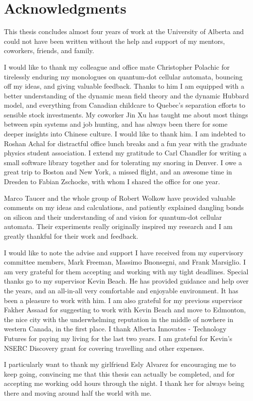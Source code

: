 \chapter*{Acknowledgments}

This thesis concludes almost four years of work at the University of
Alberta and could not have been written without the help and support of my
mentors, coworkers, friends, and family.

I would like to thank my colleague and office mate Christopher Polachic for
tirelessly enduring my monologues on quantum-dot cellular automata, bouncing off
my ideas, and giving valuable feedback. Thanks to him I am equipped with a
better understanding of the dynamic mean field theory and the dynamic Hubbard
model, and everything from Canadian childcare to Quebec's separation efforts to
sensible stock investments.  My coworker Jin Xu has taught me about most things
between spin systems and job hunting, and has always been there for some deeper
insights into Chinese culture. I would like to thank him. I am indebted to
Roshan Achal for distractful office lunch breaks and a fun year with the
graduate physics student association. I extend my gratitude to Carl Chandler for
writing a small software library together and for tolerating my snoring in
Denver. I owe a great trip to Boston and New York, a missed flight, and an
awesome time in Dresden to Fabian Zschocke, with whom I shared the office for
one year.

Marco Taucer and the whole group of Robert Wolkow have provided valuable
comments on my ideas and calculations, and patiently explained dangling
bonds on silicon and their understanding of and vision for quantum-dot cellular
automata. Their experiments really originally inspired my research and I am
greatly thankful for their work and feedback.

I would like to note the advise and support I have received from my supervisory
committee members, Mark Freeman, Massimo Bnonsegni, and Frank Marsiglio. I am
very grateful for them accepting and working with my tight deadlines. Special
thanks go to my supervisor Kevin Beach. He has provided guidance and help over
the years, and an all-in-all very comfortable and enjoyable environment. It has
been a pleasure to work with him. I am also grateful for my previous supervisor
Fakher Assaad for suggesting to work with Kevin Beach and move to Edmonton, the
nice city with the underwhelming reputation in the middle of nowhere in western
Canada, in the first place. I thank Alberta Innovates - Technology Futures for
paying my living for the last two years. I am grateful for Kevin's NSERC
Discovery grant for covering travelling and other expenses.

I particularly want to thank my girlfriend Esly Alvarez for encouraging me to
keep going, convincing me that this thesis can actually be completed, and for
accepting me working odd hours through the night. I thank her for always being
there and moving around half the world with me.
